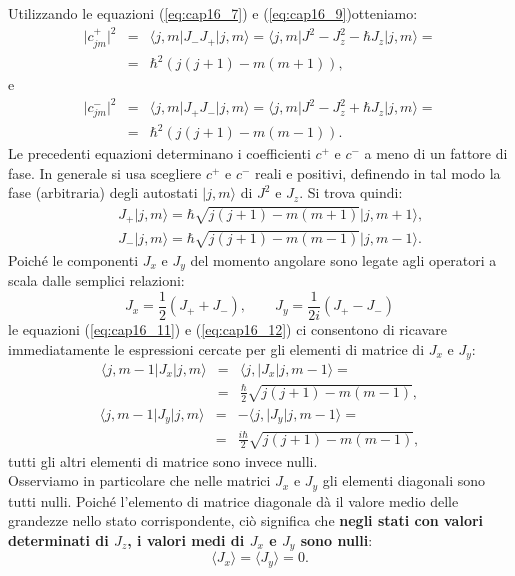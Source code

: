 Utilizzando le equazioni (\ref{eq:cap16_7}) e (\ref{eq:cap16_9})otteniamo:
\begin{eqnarray}
\vert c_{jm} ^+\vert ^2 &=& \langle j, m \vert J_- J_+\vert j, m \rangle = \langle j, m \vert J^2- J_z ^2 -\hbar J_z\vert j, m \rangle =\nonumber \\
&=& \hbar ^2 \left( j(j+1) - m (m+1)\right) ,
\end{eqnarray}
e
\begin{eqnarray}
\vert c_{jm} ^-\vert ^2 &=& \langle j, m \vert J_+ J_-\vert j, m \rangle = \langle j, m \vert J^2- J_z ^2 +\hbar J_z\vert j, m \rangle =\nonumber \\
&=& \hbar ^2 \left( j(j+1) - m (m-1)\right) .
\end{eqnarray}
Le precedenti equazioni determinano i coefficienti $c^+$ e $c^-$ a meno di un fattore di fase. In generale si usa scegliere $c^+$ e $c^-$ reali e positivi, definendo in tal modo la fase (arbitraria) degli autostati $\vert j,m \rangle$ di $J^2$ e $J_z$. Si trova quindi:
\begin{eqnarray}
& &J_+\vert j, m \rangle =\hbar \sqrt{j(j+1)-m(m+1)}\vert j, m+1 \rangle ,  \label{eq:cap16_11} \\
& &J_-\vert j, m \rangle =\hbar \sqrt{j(j+1)-m(m-1)}\vert j, m-1 \rangle  .\label{eq:cap16_12}
\end{eqnarray}
Poiché le componenti $J_x$ e $J_y$ del momento angolare sono legate agli operatori a scala dalle semplici relazioni:
\begin{equation}
J_x= \frac{1}{2}\left(J_+ + J_-\right),\qquad J_y= \frac{1}{2i}\left(J_+ - J_-\right)
\end{equation}
le equazioni (\ref{eq:cap16_11}) e (\ref{eq:cap16_12}) ci consentono di ricavare immediatamente le espressioni cercate per gli elementi di matrice di $J_x$ e $J_y$:
\begin{eqnarray}
\langle j, m-1\vert J_x\vert j, m \rangle &=&\langle j, \vert J_x\vert j, m-1 \rangle = \nonumber \\
&=& \frac{\hbar}{2}\sqrt{j(j+1)-m(m-1)} , 
\end{eqnarray}
\begin{eqnarray}
\langle j, m-1\vert J_y\vert j, m \rangle &=& -\langle j, \vert J_y\vert j, m-1 \rangle = \nonumber \\
&=& \frac{i\hbar}{2}\sqrt{j(j+1)-m(m-1)} , 
\end{eqnarray}
tutti gli altri elementi di matrice sono invece nulli.\\
Osserviamo in particolare che nelle matrici $J_x$ e $J_y$ gli elementi diagonali sono tutti nulli. Poiché l'elemento di matrice diagonale dà il valore medio delle grandezze nello stato corrispondente, ciò significa che \textbf{negli stati con valori determinati di $J_z$, i valori medi di $J_x$ e $J_y$ sono nulli}:
\begin{equation}
\langle J_x \rangle = \langle J_y \rangle =0.
\end{equation}